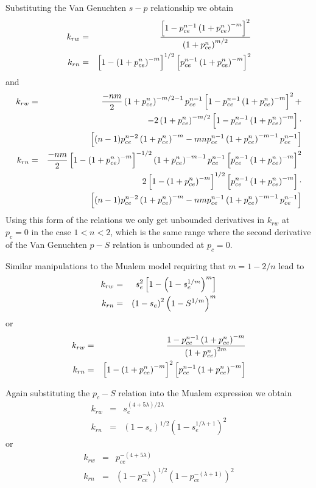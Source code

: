 \documentclass[10pt,dvips,twoside,reqno]{amsart}
\begin{document}
Substituting the Van Genuchten $s-p$ relationship we obtain
\begin{eqnarray}
k_{rw} &=& \frac{ \left[ 1 - p_{ce}^{n-1} \left(1 + p_{ce}^n \right)^{-m} \right]^2}{\left( 1 + p_{ce}^n \right)^{m/2} } \\
k_{rn} &=& \left[ 1 - \left(1  + p_{ce}^n \right)^{-m} \right]^{1/2}  \left[ p_{ce}^{n-1} \left(1 + p_{ce}^n \right)^{-m} \right]^2
\end{eqnarray}
and
\begin{eqnarray}
k_{rw} &=& \frac{-nm}{2}\left( 1 + p_{ce}^n \right)^{-m/2-1} p_{ce}^{n-1}  \left[ 1 - p_{ce}^{n-1} \left(1 + p_{ce}^n \right)^{-m} \right]^2 +\\
&& -2\left( 1 + p_{ce}^n \right)^{-m/2}  \left[ 1 - p_{ce}^{n-1} \left(1 + p_{ce}^n \right)^{-m} \right] \cdot \\
&&\left[ (n-1)p_{ce}^{n-2} \left(1 + p_{ce}^n \right)^{-m} -mn p_{ce}^{n-1} \left(1 + p_{ce}^n \right)^{-m-1}p_{ce}^{n-1}\right]\\
k_{rn} &=& \frac{-nm}{2}\left[ 1 - \left(1  + p_{ce}^n \right)^{-m} \right]^{-1/2} \left(1  + p_{ce}^n \right)^{-m-1} p_{ce}^{n-1}\left[ p_{ce}^{n-1} \left(1 + p_{ce}^n \right)^{-m} \right]^2 \\
&&2\left[ 1 - \left(1  + p_{ce}^n \right)^{-m} \right]^{1/2}  \left[ p_{ce}^{n-1} \left(1 + p_{ce}^n \right)^{-m} \right] \cdot \\
&&\left[ (n-1)p_{ce}^{n-2} \left(1 + p_{ce}^n \right)^{-m} -nm p_{ce}^{n-1} \left(1 + p_{ce}^n \right)^{-m-1} p_{ce}^{n-1}\right]
\end{eqnarray}
Using this form of the relations we only get unbounded derivatives in
$k_{rw}$ at $p_c=0$ in the case $1<n<2$, which is the same range where
the second derivative of the Van Genuchten $p-S$ relation is unbounded
at $p_c=0$.
 
 Similar manipulations to the Mualem
model requiring that $m=1 - 2/n$ lead to
\begin{eqnarray}
k_{rw} &=& s_e^2 \left[ 1 - \left(1 - s_e^{1/m} \right)^m \right] \\
k_{rn} &=& \left( 1-s_e \right)^2 \left( 1-S^{1/m} \right)^{m}
\end{eqnarray}
or
\begin{eqnarray}
k_{rw} &=& \frac{1 - p_{ce}^{n-1} \left(1 + p_{ce}^n \right)^{-m}}{\left( 1 + p_{ce}^n \right)^{2m} } \\
k_{rn} &=& \left[ 1 - \left(1  + p_{ce}^n \right)^{-m} \right]^{2}  \left[ p_{ce}^{n-1} \left(1 + p_{ce}^n \right)^{-m} \right]
\end{eqnarray}

 Again substituting the $p_c - S$
relation into the Mualem expression we obtain
\begin{eqnarray}
k_{rw} &=& s_e^{(4+5\lambda)/ 2 \lambda}\\
k_{rn} &=& (1-s_e)^{1/2} (1 - s_e^{1/\lambda + 1})^2
\end{eqnarray}
or
\begin{eqnarray}
k_{rw} &=& p_{ce}^{-(4+5\lambda)}\\
k_{rn} &=& (1-p_{ce}^{-\lambda})^{1/2} (1 - p_{ce}^{-(\lambda +1)})^2
\end{eqnarray}
\end{document}

